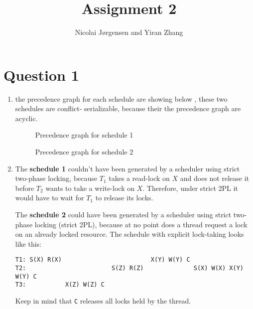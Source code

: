 \documentclass[11pt]{article}
\title          {Assignment 2}
\author         {Nicolai Jørgensen and Yiran Zhang}
\begin{document}
\maketitle
\newpage

\section{Question 1}

\begin{enumerate}
	\item
     the precedence graph for each schedule are showing below , these two schedules are conflict- 
     serializable, because their the precedence graph are acyclic.

		\begin{figure}[H]
			\centering

			\caption{Precedence graph for schedule 1} 
			\label{fig:trans-schedule-1} 
		\end{figure}

		\begin{figure}[H]
			\centering

			\caption{Precedence graph for schedule 2} 
			\label{fig:trans-schedule-1} 
		\end{figure}		
		
	\item
  The \textbf{schedule 1} couldn't have been generated by a scheduler using
  strict two-phase locking, because $T_1$ takes a read-lock on $X$ and does not
  release it before $T_2$ wants to take a write-lock on $X$. Therefore, under strict 2PL
  it would have to wait for $T_1$ to release its locks.
	
  The \textbf{schedule 2} could have been generated by a scheduler using strict
  two-phase locking (strict 2PL), because at no point does a thread request a
  lock on an already locked resource. The schedule with explicit lock-taking
  looks like this:

  \begin{verbatim}
T1: S(X) R(X)                         X(Y) W(Y) C
T2:                        S(Z) R(Z)              S(X) W(X) X(Y) W(Y) C
T3:           X(Z) W(Z) C
  \end{verbatim}

  Keep in mind that \verb|C| releases all locks held by the thread.
\end{enumerate}
\end{document}
